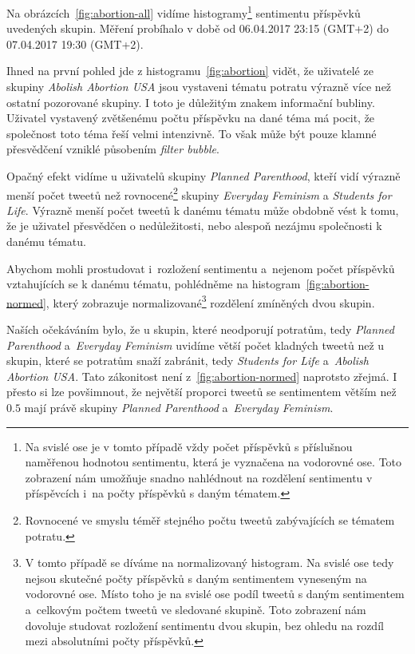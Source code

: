 \documentclass[12pt, a4paper]{article}
\numberwithin{equation}{section} 	%
\begin{document}
Na obrázcích~\autoref{fig:abortion-all} vidíme histogramy\footnote{Na svislé ose je v tomto případě vždy počet příspěvků s příslušnou naměřenou hodnotou sentimentu, která je vyznačena na vodorovné ose. Toto zobrazení nám umožňuje snadno nahlédnout na rozdělení sentimentu v příspěvcích i~na počty příspěvků s daným tématem.} sentimentu příspěvků uvedených skupin. Měření probíhalo v době od 06.04.2017 23:15 (GMT+2) do 07.04.2017 19:30 (GMT+2).

Ihned na první pohled jde z histogramu~\autoref{fig:abortion} vidět, že uživatelé ze skupiny \textit{Abolish Abortion USA} jsou vystaveni tématu potratu výrazně více než ostatní pozorované skupiny. I toto je důležitým znakem informační bubliny. Uživatel vystavený zvětšenému počtu příspěvku na dané téma má pocit, že společnost toto téma řeší velmi intenzivně. To však může být pouze klamné přesvědčení vzniklé působením \textit{filter bubble}.

Opačný efekt vidíme u uživatelů skupiny \textit{Planned Parenthood}, kteří vidí výrazně menší počet tweetů než rovnocené\footnote{Rovnocené ve smyslu téměř stejného počtu tweetů zabývajících se tématem potratu.} skupiny \textit{Everyday Feminism} a \textit{Students for Life}. Výrazně menší počet tweetů k danému tématu může obdobně vést k tomu, že je uživatel přesvědčen o nedůležitosti, nebo alespoň nezájmu společnosti k danému tématu.

Abychom mohli prostudovat i~rozložení sentimentu a~nejenom počet příspěvků vztahujících se k danému tématu, pohlédněme na histogram~\autoref{fig:abortion-normed}, který zobrazuje normalizované\footnote{V tomto případě se díváme na normalizovaný histogram. Na svislé ose tedy nejsou skutečné počty příspěvků s daným sentimentem vyneseným na vodorovné ose. Místo toho je na svislé ose podíl tweetů s daným sentimentem a~celkovým počtem tweetů ve sledované skupině. Toto zobrazení nám dovoluje studovat rozložení sentimentu dvou skupin, bez ohledu na rozdíl mezi absolutními počty příspěvků.} rozdělení zmíněných dvou skupin.

Naších očekáváním bylo, že u skupin, které neodporují potratům, tedy \textit{Planned Parenthood} a~\textit{Everyday Feminism} uvidíme větší počet kladných tweetů než u skupin, které se potratům snaží zabránit, tedy \textit{Students for Life} a~\textit{Abolish Abortion USA}. Tato zákonitost není z~\autoref{fig:abortion-normed} naprotsto zřejmá. I přesto si lze povšimnout, že největší proporci tweetů se sentimentem větším než $0.5$ mají právě skupiny \textit{Planned Parenthood} a~\textit{Everyday Feminism}.
\end{document}
